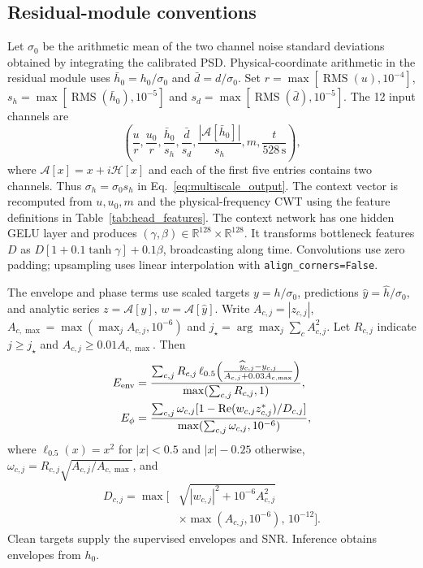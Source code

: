 \documentclass[10pt,prd,aps,a4paper,twocolumn,superscriptaddress,nofootinbib,floatfix]{revtex4-2}
\begin{document}
\subsection{Residual-module conventions}\label{app:residual_details}
Let $\sigma_0$ be the arithmetic mean of the two channel noise standard deviations obtained by integrating the calibrated PSD. Physical-coordinate arithmetic in the residual module uses $\bar h_0=h_0/\sigma_0$ and $\bar d=d/\sigma_0$. Set $r=\max[\operatorname{RMS}(u),10^{-4}]$, $s_h=\max[\operatorname{RMS}(\bar h_0),10^{-5}]$ and $s_d=\max[\operatorname{RMS}(\bar d),10^{-5}]$. The 12 input channels are
\begin{equation}
\left(\frac{u}{r},\frac{u_0}{r},\frac{\bar h_0}{s_h},\frac{\bar d}{s_d},\frac{|\mathcal A[\bar h_0]|}{s_h},m,\frac{t}{528\,\mathrm{s}}\right),
\end{equation}
where $\mathcal A[x]=x+i\mathcal H[x]$ and each of the first five entries contains two channels. Thus $\sigma_h=\sigma_0s_h$ in Eq.~\eqref{eq:multiscale_output}. The context vector is recomputed from $u,u_0,m$ and the physical-frequency CWT using the feature definitions in Table~\ref{tab:head_features}. The context network has one hidden GELU layer and produces $(\gamma,\beta)\in\mathbb R^{128}\times\mathbb R^{128}$. It transforms bottleneck features $D$ as $D[1+0.1\tanh\gamma]+0.1\beta$, broadcasting along time. Convolutions use zero padding; upsampling uses linear interpolation with \texttt{align\_corners=False}.

The envelope and phase terms use scaled targets $y=h/\sigma_0$, predictions $\widehat y=\widehat h/\sigma_0$, and analytic series $z=\mathcal A[y]$, $w=\mathcal A[\widehat y]$. Write $A_{c,j}=|z_{c,j}|$, $A_{c,\max}=\max(\max_j A_{c,j},10^{-6})$ and $j_\star=\arg\max_j\sum_c A_{c,j}^2$. Let $R_{c,j}$ indicate $j\ge j_\star$ and $A_{c,j}\ge0.01A_{c,\max}$. Then
\begin{align}
E_{\rm env}&=\frac{\sum_{c,j}R_{c,j}\,\ell_{0.5}\!\left(\frac{\widehat y_{c,j}-y_{c,j}}{A_{c,j}+0.03A_{c,\max}}\right)}{\max(\sum_{c,j}R_{c,j},1)},\nonumber\\
E_\phi&=\frac{\sum_{c,j}\omega_{c,j}[1-\operatorname{Re}(w_{c,j}z_{c,j}^*)/D_{c,j}]}{\max(\sum_{c,j}\omega_{c,j},10^{-6})},\label{eq:envelope_losses}
\end{align}
where $\ell_{0.5}(x)=x^2$ for $|x|<0.5$ and $|x|-0.25$ otherwise, $\omega_{c,j}=R_{c,j}\sqrt{A_{c,j}/A_{c,\max}}$, and
\begin{equation}
\begin{split}
D_{c,j}=\max\bigl[&\sqrt{|w_{c,j}|^2+10^{-6}A_{c,j}^2}\\
&\times\max(A_{c,j},10^{-6}),\,10^{-12}\bigr].
\end{split}
\end{equation}
Clean targets supply the supervised envelopes and SNR. Inference obtains envelopes from $h_0$.
\end{document}
